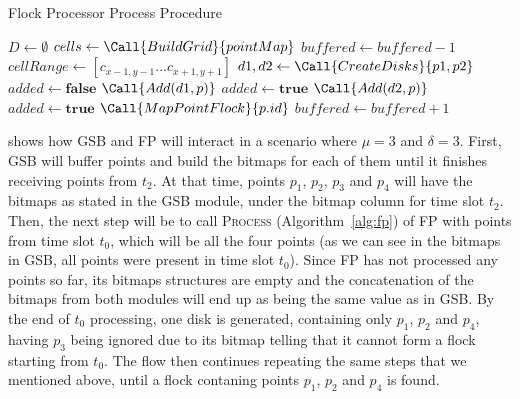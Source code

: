 \begin{algorithm}
\caption{Flock Processor Process Procedure}
\label{alg:fp}
\begin{algorithmic}[1]
        \State $D \gets \emptyset$
        \State $cells \gets \Call{BuildGrid}{pointMap}$
            \State {}
            \State $buffered \gets buffered - 1$
        \EndIf
            \State $cellRange \gets [c_{x - 1, y - 1}...c_{x + 1, y+ 1}]$
                        \State $d1, d2 \gets \Call{CreateDisks}{p1, p2}$
                            \State $added \gets \textbf{false}$
                                \State $\Call{Add(d1, p)}$
                                \State $added \gets \textbf{true}$
                            \EndIf
                                \State $\Call{Add(d2, p)}$
                                \State $added \gets \textbf{true}$
                            \EndIf
                                \State $\Call{MapPointFlock}{p.id}$
                            \EndIf
                        \EndFor
                        \State {}
                        \State {}
                    \EndIf
                \EndFor
            \EndFor
        \EndFor
        \State $buffered \gets buffered + 1$
    \EndProcedure
\end{algorithmic}
\end{algorithm}

 shows how GSB and FP will interact in a scenario where $\mu = 3$ and $\delta = 3$. First, GSB will
buffer points and build the bitmaps for each of them until it finishes receiving points from $t_2$. At that time, points
$p_1$, $p_2$, $p_3$ and $p_4$ will have the bitmaps as stated in the GSB module, under the bitmap column for time slot
$t_2$. Then, the next step will be to call \textsc{Process} (Algorithm~\ref{alg:fp}) of FP with points from time slot
$t_0$, which will be all the four points (as we can see in the bitmaps in GSB, all points were present in time slot
$t_0$). Since FP has not processed any points so far, its bitmaps structures are empty and the concatenation of the
bitmaps from both modules will end up as being the same value as in GSB. By the end of $t_0$ processing, one disk is
generated, containing only $p_1$, $p_2$ and $p_4$, having $p_3$ being ignored due to its bitmap telling that it cannot
form a flock starting from $t_0$. The flow then continues repeating the same steps that we mentioned above, until a
flock contaning points $p_1$, $p_2$ and $p_4$ is found.

